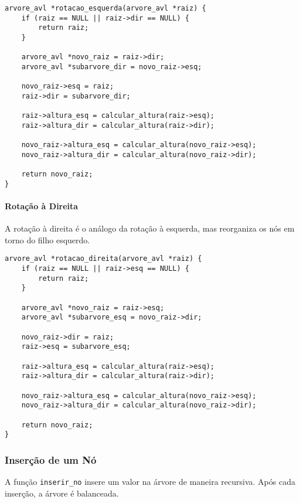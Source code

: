 \begin{lstlisting}
arvore_avl *rotacao_esquerda(arvore_avl *raiz) {
    if (raiz == NULL || raiz->dir == NULL) {
        return raiz;
    }
      
    arvore_avl *novo_raiz = raiz->dir;
    arvore_avl *subarvore_dir = novo_raiz->esq;
      
    novo_raiz->esq = raiz;
    raiz->dir = subarvore_dir;
      
    raiz->altura_esq = calcular_altura(raiz->esq);
    raiz->altura_dir = calcular_altura(raiz->dir);
      
    novo_raiz->altura_esq = calcular_altura(novo_raiz->esq);
    novo_raiz->altura_dir = calcular_altura(novo_raiz->dir);
      
    return novo_raiz;
}
\end{lstlisting}

\paragraph{Rotação à Direita}  
A rotação à direita é o análogo da rotação à esquerda, mas reorganiza os nós em torno do filho esquerdo.

\begin{lstlisting}
arvore_avl *rotacao_direita(arvore_avl *raiz) {
    if (raiz == NULL || raiz->esq == NULL) {
        return raiz;
    }
      
    arvore_avl *novo_raiz = raiz->esq;
    arvore_avl *subarvore_esq = novo_raiz->dir;
      
    novo_raiz->dir = raiz;
    raiz->esq = subarvore_esq;
      
    raiz->altura_esq = calcular_altura(raiz->esq);
    raiz->altura_dir = calcular_altura(raiz->dir);
      
    novo_raiz->altura_esq = calcular_altura(novo_raiz->esq);
    novo_raiz->altura_dir = calcular_altura(novo_raiz->dir);
      
    return novo_raiz;
}
\end{lstlisting}

\vspace{3mm}

\subsubsection{Inserção de um Nó}

\vspace{3mm}

A função \texttt{inserir\_no} insere um valor na árvore de maneira recursiva. Após cada inserção, a árvore é balanceada.

